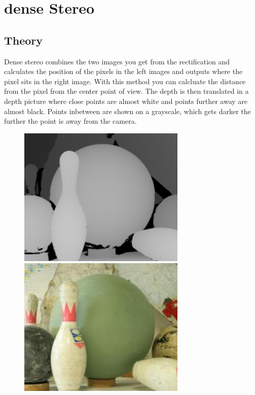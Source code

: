 \documentclass[12pt,draft,a4paper]{article}
\begin{document}
\graphicspath{{./images/}}

\section{dense Stereo}
\subsection{Theory}
Dense stereo combines the two images you get from the rectification
and calculates the position of the pixels in the left images and
outputs where the pixel sits in the right  image. With this method you
can calcluate the distance from the pixel from the center point of
view. The depth is then translated in a depth picture where close
points are almost white and points further away are almost
black. Points inbetween are shown on a grayscale, which gets darker
 the further the point is away from the camera.\\

\begin{figure}
\includegraphics[width=8cm]{depthmap}
\includegraphics[width=8cm]{depthmap_original}
\end{figure}
\end{document}
